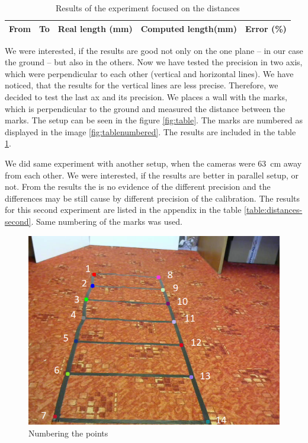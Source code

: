 \begin{table}
\centering
\begin{tabular}{|r|r|r|r|r|}
\hline
From	& To	& Real length (mm) & Computed length(mm) & Error (\%) \\
\hline
\hline

\hline
\end{tabular}
\caption{Results of the experiment focused on the distances}
\label{table:distances}
\end{table}

We were interested, if the results are good not only on the one plane -- in our
case the ground -- but also in the others. Now we have tested the precision in
two axis, which were perpendicular to each other (vertical and horizontal
lines). We have noticed, that the results for the vertical lines are less
precise. Therefore, we decided to test the last ax and its precision. We places
a wall with the marks, which is perpendicular to the ground and measured the
distance between the marks. The setup can be seen in the figure
\ref{fig:table}. The marks are numbered as displayed in the image
\ref{fig:tablenumbered}. The results are included in the table
\ref{table:distances}. 

We did same experiment with another setup, when the cameras were 63~cm away
from each other. We were interested, if the results are better in parallel
setup, or not. From the results the is no evidence of the different precision
and the differences may be still cause by different precision of the
calibration. The results for this second experiment are listed in the appendix
in the table \ref{table:distances-second}. Same numbering of the marks was used.

\begin{figure}
\centering
\includegraphics[width=0.8\linewidth]{img/experiments/right-ladder-numbered.png}
\caption{Numbering the points}
\label{fig:ladder_numbered}
\end{figure}

